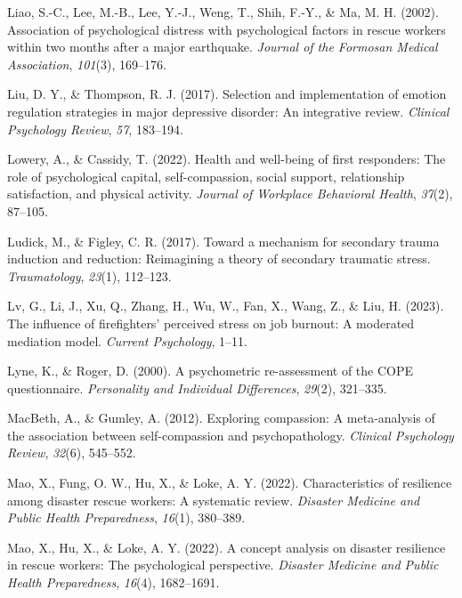 \documentclass[
  man]{apa7}
\newlength{\cslhangindent}
\newlength{\cslentryspacingunit} %
\newenvironment{CSLReferences}[2] %
 {%
  \setlength{\parindent}{0pt}
  \ifodd #1
  \let\oldpar\par
  \def\par{\hangindent=\cslhangindent\oldpar}
  \fi
  \setlength{\parskip}{#2\cslentryspacingunit}
 }%
 {}
\begin{document}
\begin{CSLReferences}{1}{0}
\leavevmode{}%
Liao, S.-C., Lee, M.-B., Lee, Y.-J., Weng, T., Shih, F.-Y., \& Ma, M. H. (2002). Association of psychological distress with psychological factors in rescue workers within two months after a major earthquake. \emph{Journal of the Formosan Medical Association}, \emph{101}(3), 169--176.

\leavevmode{}%
Liu, D. Y., \& Thompson, R. J. (2017). Selection and implementation of emotion regulation strategies in major depressive disorder: An integrative review. \emph{Clinical Psychology Review}, \emph{57}, 183--194.

\leavevmode{}%
Lowery, A., \& Cassidy, T. (2022). Health and well-being of first responders: The role of psychological capital, self-compassion, social support, relationship satisfaction, and physical activity. \emph{Journal of Workplace Behavioral Health}, \emph{37}(2), 87--105.

\leavevmode{}%
Ludick, M., \& Figley, C. R. (2017). Toward a mechanism for secondary trauma induction and reduction: Reimagining a theory of secondary traumatic stress. \emph{Traumatology}, \emph{23}(1), 112--123.

\leavevmode{}%
Lv, G., Li, J., Xu, Q., Zhang, H., Wu, W., Fan, X., Wang, Z., \& Liu, H. (2023). The influence of firefighters' perceived stress on job burnout: A moderated mediation model. \emph{Current Psychology}, 1--11.

\leavevmode{}%
Lyne, K., \& Roger, D. (2000). A psychometric re-assessment of the COPE questionnaire. \emph{Personality and Individual Differences}, \emph{29}(2), 321--335.

\leavevmode{}%
MacBeth, A., \& Gumley, A. (2012). Exploring compassion: A meta-analysis of the association between self-compassion and psychopathology. \emph{Clinical Psychology Review}, \emph{32}(6), 545--552.

\leavevmode{}%
Mao, X., Fung, O. W., Hu, X., \& Loke, A. Y. (2022). Characteristics of resilience among disaster rescue workers: A systematic review. \emph{Disaster Medicine and Public Health Preparedness}, \emph{16}(1), 380--389.

\leavevmode{}%
Mao, X., Hu, X., \& Loke, A. Y. (2022). A concept analysis on disaster resilience in rescue workers: The psychological perspective. \emph{Disaster Medicine and Public Health Preparedness}, \emph{16}(4), 1682--1691.


\end{CSLReferences}
\end{document}
